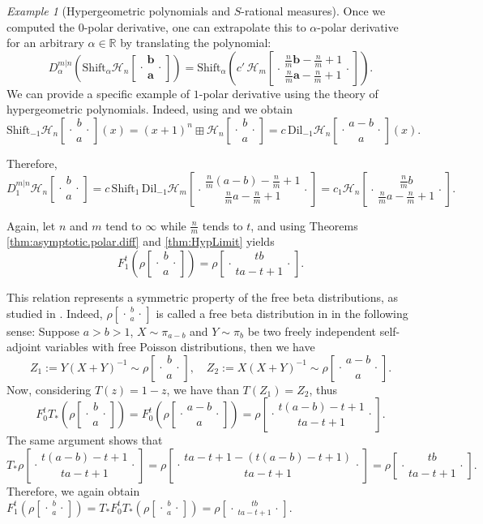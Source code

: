 \documentclass[reqno,11pt]{amsart}
\theoremstyle{remark}
\newtheorem{example}[theorem]{Example}
\newcommand{\rr}{\mathbb{R}}
\newcommand{\dil}[1]{\mbox{Dil}_{#1}}
\newcommand{\shift}[1]{\mbox{Shift}_{#1}}
\newcommand*\HGP[3]{%
 \mathcal{H}_{#1}{\left[\genfrac..{0pt}{1}{#2}{#3}\right]}%
}
\newcommand*\SRM[2]{%
 \rho{\left[\genfrac..{0pt}{1}{#1}{#2}\right]}%
}
\newcommand{\polars}[3]{D_{#1}^{#2|#3}}
\newcommand{\pfreepower}[2]{F_{#1}^{#2}}
\begin{document}
\begin{example}[Hypergeometric polynomials and $S$-rational measures]
Once we computed the 0-polar derivative, one can extrapolate this to $\alpha$-polar derivative for an arbitrary $\alpha\in\rr$ by translating the polynomial:
$$\polars{\alpha}{m}{n}\left( \shift{\alpha} \HGP{n}{\bm b}{\bm a} \right)=\shift{\alpha} \left(c' \, \HGP{m}{\frac{n}{m}\bm b-\frac{n}{m}+1}{\frac{n}{m}\bm a-\frac{n}{m}+1} \right).$$ 
We can provide a specific example of $1$-polar derivative using the theory of hypergeometric polynomials. Indeed, using \cite[Equation (12)]{grinshpan2013generalized} and \cite[Equation (84)]{martinez2024hypergeometric} we obtain
$$\shift{-1} \HGP{n}{b}{a} (x)=(x+1)^n\boxplus \HGP{n}{b}{a} = c\, \dil{-1}\HGP{n}{a-b}{a}(x).$$

Therefore,
$$\polars{1}{m}{n}\HGP{n}{b}{a}=c \,\shift{1}  \, \dil{-1} \HGP{m}{\frac{n}{m} (a-b)-\frac{n}{m}+1}{\frac{n}{m} a-\frac{n}{m}+1}  = c_1 \HGP{n}{\frac{n}{m} b}{\frac{n}{m} a-\frac{n}{m}+1}.$$

Again, let $n$ and $m$ tend to $\infty$ while $\frac{n}{m}$ tends to $t$, and using Theorems \ref{thm:asymptotic.polar.diff} and  \ref{thm:HypLimit}  yields
\[ \pfreepower{1}{t}\left( \SRM{ b}{ a} \right) =  \SRM{t b}{ ta-t+1}. \]

This relation represents a symmetric property of the free beta distributions, as studied in \cite[Section 3.4]{yoshida2020remarks}. Indeed, $ \SRM{ b}{ a}$ is called a free beta distribution in \cite{yoshida2020remarks} in the following sense: Suppose $ a>b>1 $, $X\sim \pi_{a-b}$ and $Y\sim \pi_{b}$ be two freely independent self-adjoint variables with free Poisson distributions, then we have
$$ Z_1:=Y(X+Y)^{-1}\sim \SRM{ b}{ a},\quad Z_2:=X(X+Y)^{-1}\sim \SRM{ a-b}{ a}.$$
Now, considering $T(z) = 1-z$, we have than $T(Z_1) = Z_2 $, thus 
$$ \pfreepower{0}{t}T_*\left(\SRM{ b}{ a}\right) = \pfreepower{0}{t}\left(\SRM{ a-b}{ a}\right) = \SRM{ t(a-b)-t+1}{ ta-t+1} .$$
The same argument shows that 
$$T_{*}\SRM{ t(a-b)-t+1}{ ta-t+1} = \SRM{ ta-t+1-(t(a-b)-t+1)}{ ta-t+1} = \SRM{ tb}{ta-t+1}.$$
Therefore, we again obtain $  \pfreepower{1}{t}\left( \SRM{ b}{ a} \right)= T_*\pfreepower{0}{t}T_*\left(\SRM{ b}{ a}\right) =  \SRM{t b}{ ta-t+1}. $
\end{example} 
\end{document}
